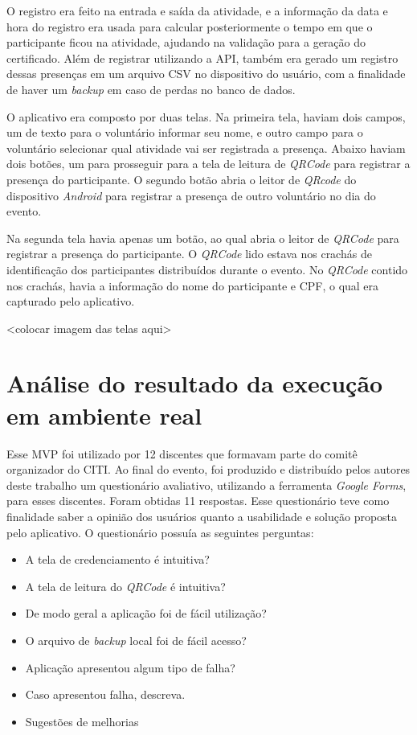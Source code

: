 O registro era feito na entrada e saída da atividade, e a informação da data e hora do registro era usada para calcular posteriormente o tempo em que o participante ficou na atividade, ajudando na validação para a geração do certificado. Além de registrar utilizando a API, também era gerado um registro dessas presenças em um arquivo CSV no dispositivo do usuário, com a finalidade de haver um \textit{backup} em caso de perdas no banco de dados.

O aplicativo era composto por duas telas. Na primeira tela, haviam dois campos, um de texto para o voluntário informar seu nome, e outro campo para o voluntário selecionar qual atividade vai ser registrada a presença. Abaixo haviam dois botões, um para prosseguir para a tela de leitura de \textit{QRCode} para registrar a presença do participante. O segundo botão abria o leitor de \textit{QRcode} do dispositivo \textit{Android} para registrar a presença de outro voluntário no dia do evento.

Na segunda tela havia apenas um botão, ao qual abria o leitor de \textit{QRCode} para registrar a presença do participante. O \textit{QRCode} lido estava nos crachás de identificação dos participantes distribuídos durante o evento. No \textit{QRCode} contido nos crachás, havia a informação do nome do participante e CPF, o qual era capturado pelo aplicativo.

<colocar imagem das telas aqui>

\section{Análise do resultado da execução em ambiente real}

Esse MVP foi utilizado por 12 discentes que formavam parte do comitê organizador do CITI. Ao final do evento, foi produzido e distribuído pelos autores deste trabalho um questionário avaliativo, utilizando a ferramenta \textit{Google Forms}, para esses discentes. Foram obtidas 11 respostas. Esse questionário teve como finalidade saber a opinião dos usuários quanto a usabilidade e solução proposta pelo aplicativo. O questionário possuía as seguintes perguntas:

\begin{itemize}
    \item A tela de credenciamento é intuitiva?
    \item A tela de leitura do \textit{QRCode} é intuitiva?
    \item De modo geral a aplicação foi de fácil utilização?
    \item O arquivo de \textit{backup} local foi de fácil acesso?
    \item Aplicação apresentou algum tipo de falha?
    \item Caso apresentou falha, descreva.
    \item Sugestões de melhorias
\end{itemize}

